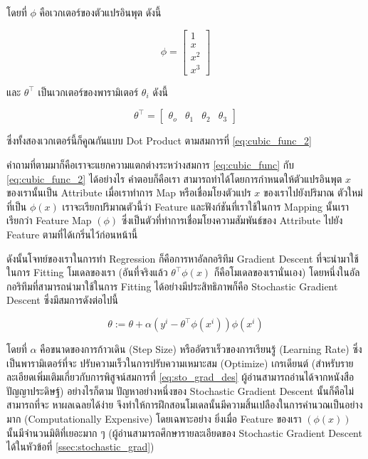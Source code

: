 \noindent โดยที่ $\phi$ คือเวกเตอร์ของตัวแปรอินพุต ดังนี้

\begin{equation}
\phi = 
\begin{bmatrix}
    1 \\
    x \\
    x^{2} \\
    x^{3} 
\end{bmatrix}
\end{equation}

\noindent และ $\theta^{\top}$ เป็นเวกเตอร์ของพารามิเตอร์ $\theta_{i}$ ดังนี้

\begin{equation}
\theta^{\top} =
\begin{bmatrix}
    \theta_{o} & \theta_{1} & \theta_{2} & \theta_{3}
\end{bmatrix}
\end{equation}

\noindent ซึ่งทั้งสองเวกเตอร์นี้ก็คูณกันแบบ Dot Product ตามสมการที่ \ref{eq:cubic_func_2}
 
คำถามที่ตามมาก็คือเราจะแยกความแตกต่างระหว่างสมการ \ref{eq:cubic_func} กับ \ref{eq:cubic_func_2} ได้อย่างไร คำตอบก็คือเรา%
สามารถทำได้โดยการกำหนดให้ตัวแปรอินพุต $x$ ของเรานั้นเป็น Attribute เมื่อเราทำการ Map หรือเชื่อมโยงตัวแปร $x$ ของเราไปยังปริมาณ%
ตัวใหม่ที่เป็น $\phi(x)$ เราจะเรียกปริมาณตัวนี้ว่า Feature และฟังก์ชันที่เราใช้ในการ Mapping นั้นเราเรียกว่า Feature Map $(\phi)$ 
ซึ่งเป็นตัวที่ทำการเชื่อมโยงความสัมพันธ์ของ Attribute ไปยัง Feature ตามที่ได้เกริ่นไว้ก่อนหน้านี้

ดังนั้นโจทย์ของเราในการทำ Regression ก็คือการหาอัลกอริทึม Gradient Descent ที่จะนำมาใช้ในการ Fitting โมเดลของเรา (อันที่จริงแล้ว
$\theta^{\top}\phi(x)$ ก็คือโมเดลของเรานั่นเอง) โดยหนึ่งในอัลกอริทึมที่สามารถนำมาใช้ในการ Fitting ได้อย่างมีประสิทธิภาพก็คือ 
Stochastic Gradient Descent ซึ่งมีสมการดังต่อไปนี้

\begin{equation}\label{eq:sto_grad_des}
    \theta := \theta + \alpha (y^{i} - \theta^{\top}\phi(x^{i}))\phi(x^{i})
\end{equation}

\noindent โดยที่ $\alpha$ คือขนาดของการก้าวเดิน (Step Size) หรืออัตราเร็วของการเรียนรู้ (Learning Rate) ซึ่งเป็นพารามิเตอร์ที่จะ%
ปรับความเร็วในการปรับความเหมาะสม (Optimize) เกรเดียนต์ (สำหรับรายละเอียดเพิ่มเติมเกี่ยวกับการพิสูจน์สมการที่ \ref{eq:sto_grad_des} 
ผู้อ่านสามารถอ่านได้จากหนังสือปัญญาประดิษฐ์) อย่างไรก็ตาม ปัญหาอย่างหนึ่งของ Stochastic Gradient Descent นั้นก็คือไม่สามารถที่จะ%
หาผลเฉลยได้ง่าย จึงทำให้การฝึกสอนโมเดลนั้นมีความสิ้นเปลืองในการคำนวณเป็นอย่างมาก (Computationally Expensive) โดยเฉพาะอย่าง%
ยิ่งเมื่อ Feature ของเรา $(\phi(x))$ นั้นมีจำนวนมิติที่เยอะมาก ๆ (ผู้อ่านสามารถศึกษารายละเอียดของ Stochastic Gradient Descent 
ได้ในหัวข้อที่ \ref{ssec:stochastic_grad})

